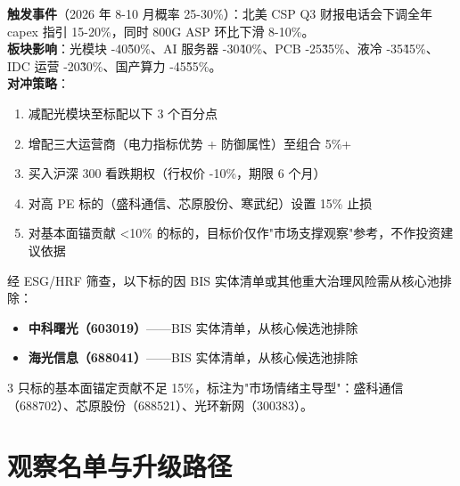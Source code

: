 \begin{exhibitbox}[综合失败场景与对冲策略]
\textbf{触发事件}（2026 年 8-10 月概率 25-30\%）：北美 CSP Q3 财报电话会下调全年 capex 指引 15-20\%，同时 800G ASP 环比下滑 8-10\%。\\
\textbf{板块影响}：光模块 -40\~50\%、AI 服务器 -30\~40\%、PCB -25\~35\%、液冷 -35\~45\%、IDC 运营 -20\~30\%、国产算力 -45\~55\%。\\
\textbf{对冲策略}：
\begin{enumerate}
\item 减配光模块至标配以下 3 个百分点
\item 增配三大运营商（电力指标优势 + 防御属性）至组合 5\%+
\item 买入沪深 300 看跌期权（行权价 -10\%，期限 6 个月）
\item 对高 PE 标的（盛科通信、芯原股份、寒武纪）设置 15\% 止损
\item 对基本面锚贡献 <10\% 的标的，目标价仅作"市场支撑观察"参考，不作投资建议依据
\end{enumerate}
\end{exhibitbox}

\begin{riskbox}
经 ESG/HRF 筛查，以下标的因 BIS 实体清单或其他重大治理风险需从核心池排除：
\begin{itemize}
\item \textbf{中科曙光（603019）}——BIS 实体清单，从核心候选池排除
\item \textbf{海光信息（688041）}——BIS 实体清单，从核心候选池排除
\end{itemize}
3 只标的基本面锚定贡献不足 15\%，标注为"市场情绪主导型"：盛科通信（688702）、芯原股份（688521）、光环新网（300383）。
\end{riskbox}

\section{观察名单与升级路径}


